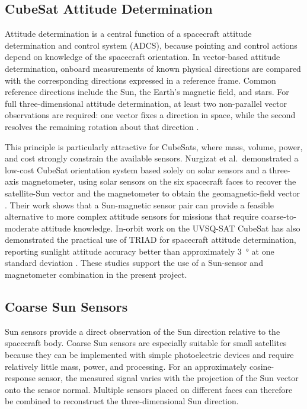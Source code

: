 \documentclass[11pt,a4paper]{article}
\begin{document}
\subsection{CubeSat Attitude Determination}

Attitude determination is a central function of a spacecraft attitude determination and control system (ADCS), because pointing and control actions depend on knowledge of the spacecraft orientation. In vector-based attitude determination, onboard measurements of known physical directions are compared with the corresponding directions expressed in a reference frame. Common reference directions include the Sun, the Earth's magnetic field, and stars. For full three-dimensional attitude determination, at least two non-parallel vector observations are required: one vector fixes a direction in space, while the second resolves the remaining rotation about that direction \cite{shuster1981triad}.

This principle is particularly attractive for CubeSats, where mass, volume, power, and cost strongly constrain the available sensors. Nurgizat et al.\ demonstrated a low-cost CubeSat orientation system based solely on solar sensors and a three-axis magnetometer, using solar sensors on the six spacecraft faces to recover the satellite-Sun vector and the magnetometer to obtain the geomagnetic-field vector \cite{nurgizat2023lowcost}. Their work shows that a Sun-magnetic sensor pair can provide a feasible alternative to more complex attitude sensors for missions that require coarse-to-moderate attitude knowledge. In-orbit work on the UVSQ-SAT CubeSat has also demonstrated the practical use of TRIAD for spacecraft attitude determination, reporting sunlight attitude accuracy better than approximately \SI{3}{\degree} at one standard deviation \cite{finance2021uvsqsat}. These studies support the use of a Sun-sensor and magnetometer combination in the present project.

\subsection{Coarse Sun Sensors}

Sun sensors provide a direct observation of the Sun direction relative to the spacecraft body. Coarse Sun sensors are especially suitable for small satellites because they can be implemented with simple photoelectric devices and require relatively little mass, power, and processing. For an approximately cosine-response sensor, the measured signal varies with the projection of the Sun vector onto the sensor normal. Multiple sensors placed on different faces can therefore be combined to reconstruct the three-dimensional Sun direction.
\end{document}
